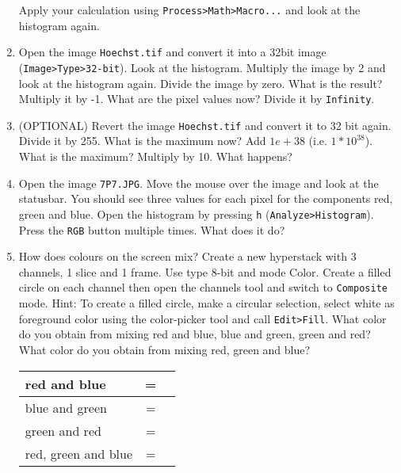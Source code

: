 \begin{enumerate}
Apply your calculation using \texttt{Process>Math>Macro...} and look at the histogram again.

\item Open the image \texttt{Hoechst.tif} and convert it into a 32bit image (\texttt{Image>Type>32-bit}). Look at the histogram. Multiply the image by 2 and look at the histogram again. Divide the image by zero. What is the result? Multiply it by -1. What are the pixel values now? Divide it by \texttt{Infinity}.

\item {\color{blue}  (OPTIONAL)} Revert the image \texttt{Hoechst.tif} and convert it to 32 bit again. Divide it by 255. What is the maximum now? Add $1e+38$ (i.e. $1*10^{38}$). What is the maximum? Multiply by 10. What happens?

\fbox{
	\begin{minipage}{\linewidth}
		\hfill\vspace{2cm}
	\end{minipage}
	}
	
\item Open the image \texttt{7P7.JPG}. Move the mouse over the image and look at the statusbar. You should see three values for each pixel for the components red, green and blue. Open the
histogram by pressing \texttt{h} (\texttt{Analyze>Histogram}). Press the \texttt{RGB} button multiple times. What does it do?	

\fbox{
	\begin{minipage}{\linewidth}
		\hfill\vspace{2cm}
	\end{minipage}
	}
	
\item How does colours on the screen mix? Create a new hyperstack with 3 channels, 1 slice and 1
frame. Use type 8-bit and mode Color. Create a filled circle on each channel then open the
channels tool and switch to \texttt{Composite} mode. Hint: To create a filled circle, make a circular selection, select white as foreground color using the color-picker tool and call \texttt{Edit>Fill}. What color do you obtain from mixing red and blue, blue and green, green and red? What color do you obtain from mixing red, green and blue?

\begin{tabular}{|lcp{2cm}|}
   \hline 
    red and blue & = & \\
    \hline 
 	blue and green & = & \\
   \hline
	green and red & = & \\
   \hline
	red, green and blue & = & \\
   \hline
\end{tabular}

\end{enumerate}

